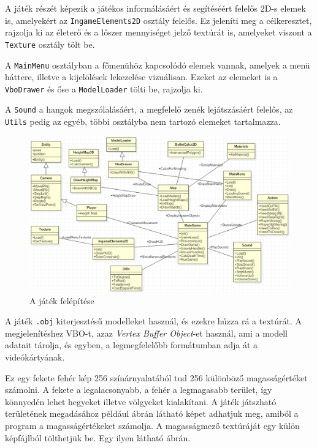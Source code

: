 A játék részét képezik a játékos informálásáért és segítéséért felelős 2D-s elemek is, amelyekért az \texttt{IngameElements2D} osztály felelős. Ez jeleníti meg a célkeresztet, rajzolja ki az életerő és a lőszer mennyiséget jelző textúrát is, amelyeket viszont a \texttt{Texture} osztály tölt be.

A \texttt{MainMenu} osztályban a főmenühöz kapcsolódó elemek vannak, amelyek a menü háttere, illetve a kijelölések lekezelése vizuálisan. Ezeket az elemeket is a \texttt{VboDrawer} és őse a \texttt{ModelLoader} tölti be, rajzolja ki.

A \texttt{Sound} a hangok megszólalásáért, a megfelelő zenék lejátszásáért felelős, az \texttt{Utils} pedig az egyéb, többi osztályba nem tartozó elemeket tartalmazza.

\begin{figure}[h]
\centering
\includegraphics[scale=0.5]{kepek/uml.png}
\caption{A játék felépítése}
\label{fig:uml}
\end{figure}


A játék \texttt{.obj} kiterjesztésű modelleket használ, és ezekre húzza rá a textúrát. A megjelenítéshez VBO-t, azaz \textit{Vertex Buffer Object}-et használ, ami a modell adatait tárolja, és egyben, a legmegfelelőbb formátumban adja át a videókártyának.

Ez egy fekete fehér kép 256 színárnyalatából tud 256 különböző magasságértéket számolni. A fekete a legalacsonyabb, a fehér a legmagasabb terület, így könnyedén lehet hegyeket illetve völgyeket kialakítani. A játék játszható területének megadásához például  ábrán látható képet adhatjuk meg, amiből a program a magasságértékeket számolja. A magasságmező textúráját egy külön képfájlból tölthetjük be. Egy ilyen látható  ábrán.

